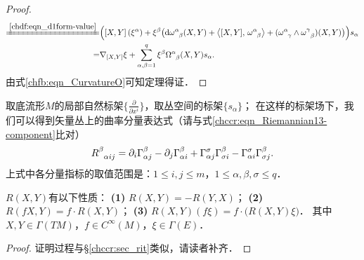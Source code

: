 \begin{proof}
\begin{align*}
   \xlongequal{\ref{chdf:eqn_d1form-value}}&\Bigl( \left[X,Y\right](\xi^\alpha)
   +\xi^\beta \bigl( \mathrm{d}\omega_{\hphantom{\alpha}\beta}^\alpha (X,Y)
   +\left< [X,Y],\, \omega_{\hphantom{\alpha}\beta}^\alpha\right> 
   + (\omega_{\hphantom{\alpha}\gamma}^\alpha \wedge \omega_{\hphantom{\alpha}\beta}^\gamma)(X,Y)
    \bigr)  \Bigr)s_\alpha  \\
   =&\nabla_{[X,Y]} \xi + \sum_{\alpha,\beta=1}^{q} 
   \xi^\beta \Omega_{\hphantom{\alpha}\beta}^\alpha (X,Y) s_\alpha .
\end{align*}
由式\eqref{chfb:eqn_CurvatureO}可知定理得证．
\end{proof}



取底流形$M$的局部自然标架$\{\frac{\partial }{\partial x^i}\}$，取丛空间的标架$\{s_\alpha\}$；
在这样的标架场下，我们可以得到矢量丛上的曲率分量表达式（请与式\eqref{chccr:eqn_Riemannian13-component}比对）
\begin{equation}\label{chfb:eqn_R-vector-bundle}
    R_{\hphantom{\alpha}\alpha i j}^\beta = {\partial_i} \Gamma_{\alpha j}^{\beta} -\partial_j \Gamma_{\alpha i}^{\beta}
    +\Gamma_{\alpha j}^{\sigma} \Gamma_{\sigma i}^{\beta} -  \Gamma_{\alpha i}^{\sigma}\Gamma_{\sigma j}^{\beta} .   
\end{equation}
上式中各分量指标的取值范围是：$ 1\leqslant i,j \leqslant m $，$ 1\leqslant \alpha,\beta,\sigma \leqslant q$．


\begin{theorem}
    $R(X, Y)$有以下性质：
    {\bfseries (1)} $R(X, Y)=-R(Y, X)$；
    {\bfseries (2)} $R(f X, Y)=f \cdot R(X, Y)$；
    {\bfseries (3)} $R(X, Y)(f \xi)=f \cdot\bigl(R(X, Y) \xi\bigr)$．
    其中$X, Y \in \Gamma(TM)$，$ f \in C^{\infty}(M)$，$ \xi \in \Gamma(E)$．
\end{theorem}
\begin{proof}
    证明过程与\S\ref{chccr:sec_rit}类似，请读者补齐．
\end{proof}


